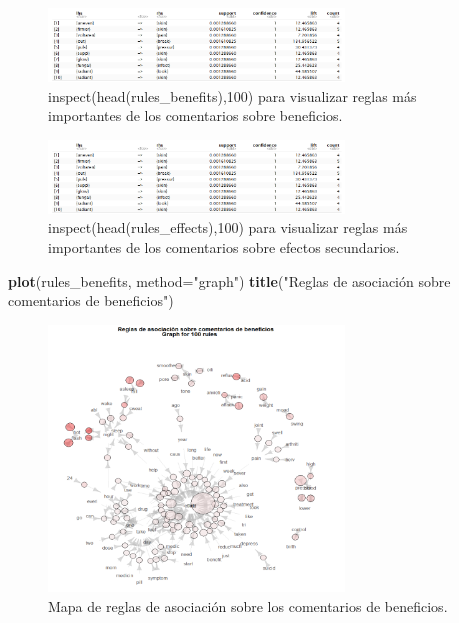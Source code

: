 \documentclass[spanish,]{article}
\newenvironment{Shaded}{\begin{snugshade}}{\end{snugshade}}
\newcommand{\KeywordTok}[1]{\textcolor[rgb]{0.13,0.29,0.53}{\textbf{#1}}}
\newcommand{\DataTypeTok}[1]{\textcolor[rgb]{0.13,0.29,0.53}{#1}}
\newcommand{\StringTok}[1]{\textcolor[rgb]{0.31,0.60,0.02}{#1}}
\newcommand{\NormalTok}[1]{#1}
\begin{document}
\begin{figure}[ht]
    \centering
    \includegraphics[width=0.7\textwidth]{figuras/asociacion/reglas_general_beneficios.png}
    \caption{inspect(head(rules\_benefits),100) para visualizar reglas más importantes de los comentarios sobre beneficios.}
    \label{fig:asociacion:reglasBenefits}
\end{figure}

\begin{figure}[ht]
    \centering
    \includegraphics[width=0.7\textwidth]{figuras/asociacion/reglas_general_beneficios.png}
    \caption{inspect(head(rules\_effects),100) para visualizar reglas más importantes de los comentarios sobre efectos secundarios.}
    \label{fig:asociacion:reglasEffects}
\end{figure}

\begin{Shaded}
\begin{Highlighting}[]
\KeywordTok{plot}\NormalTok{(rules_benefits, }\DataTypeTok{method=}\StringTok{"graph"}\NormalTok{)}
\KeywordTok{title}\NormalTok{(}\StringTok{"Reglas de asociación sobre comentarios de beneficios"}\NormalTok{)}
\end{Highlighting}
\end{Shaded}

\begin{figure}[ht]
    \centering
    \includegraphics[width=0.7\textwidth]{figuras/asociacion/asociacion_beneficios.png}
    \caption{Mapa de reglas de asociación sobre los comentarios de beneficios.}
    \label{fig:asociacion:benefits}
\end{figure}
\end{document}
